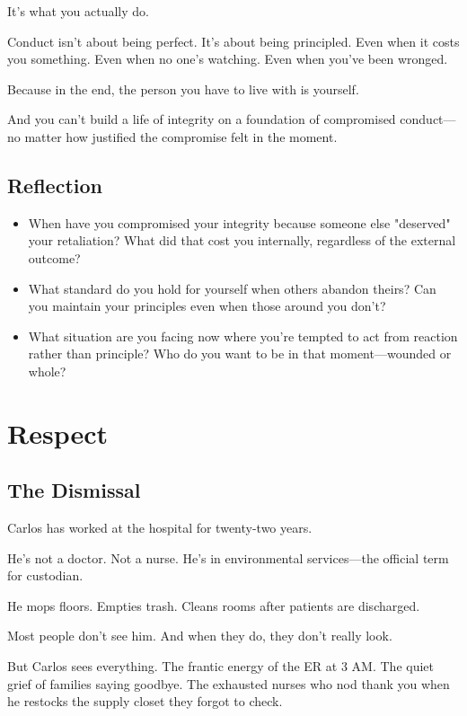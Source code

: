 \documentclass[11pt,twoside]{book}
\begin{document}
It's what you actually do.

Conduct isn't about being perfect. It's about being principled. Even when it costs you something. Even when no one's watching. Even when you've been wronged.

Because in the end, the person you have to live with is yourself.

And you can't build a life of integrity on a foundation of compromised conduct—no matter how justified the compromise felt in the moment.

\section*{Reflection}

\begin{itemize}
\item When have you compromised your integrity because someone else "deserved" your retaliation? What did that cost you internally, regardless of the external outcome?
\item What standard do you hold for yourself when others abandon theirs? Can you maintain your principles even when those around you don't?
\item What situation are you facing now where you're tempted to act from reaction rather than principle? Who do you want to be in that moment—wounded or whole?
\end{itemize}

\chapter{Respect}

\section*{The Dismissal}

Carlos has worked at the hospital for twenty-two years.

He's not a doctor. Not a nurse. He's in environmental services—the official term for custodian.

He mops floors. Empties trash. Cleans rooms after patients are discharged.

Most people don't see him. And when they do, they don't really look.

But Carlos sees everything. The frantic energy of the ER at 3 AM. The quiet grief of families saying goodbye. The exhausted nurses who nod thank you when he restocks the supply closet they forgot to check.
\end{document}
